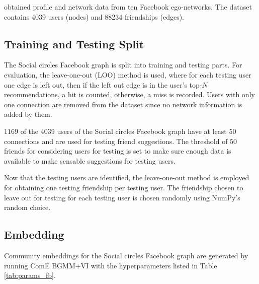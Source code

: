 \documentclass[conference]{IEEEtran}
\begin{document}
\citeauthor{social_circles_in_ego_networks} obtained profile and network data from ten Facebook ego-networks. The dataset contains 4039 users (nodes) and 88234 friendships (edges).

\subsection{Training and Testing Split}

The Social circles Facebook graph is split into training and testing parts. For evaluation, the leave-one-out (LOO) method is used, where for each testing user one edge is left out, then if the left out edge is in the user's top-$N$ recommendations, a hit is counted, otherwise, a miss is recorded.
Users with only one connection are removed from the dataset since no network information is added by them.

$1169$ of the 4039 users of the Social circles Facebook graph have at least $50$ connections and are used for testing friend suggestions. The threshold of $50$ friends for considering users for testing is set to make sure enough data is available to make sensable suggestions for testing users.

Now that the testing users are identified, the leave-one-out method is employed for obtaining one testing friendship per testing user. The friendship chosen to leave out for testing for each testing user is chosen randomly using NumPy's random choice.\cite{oliphant2006guide, van2011numpy}

\subsection{Embedding}

Community embeddings for the Social circles Facebook graph are generated by running ComE BGMM+VI with the hyperparameters listed in Table \ref{tab:params_fb}.
\end{document}
